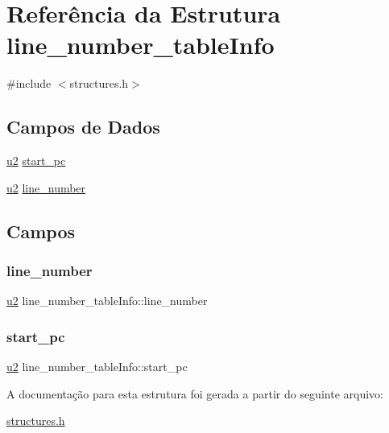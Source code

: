 \hypertarget{structline__number__tableInfo}{}\section{Referência da Estrutura line\+\_\+number\+\_\+table\+Info}
\label{structline__number__tableInfo}


{\ttfamily \#include $<$structures.\+h$>$}

\subsection*{Campos de Dados}
\begin{DoxyCompactItemize}
\item 
\hyperlink{lista__operandos_8h_a732cde1300aafb73b0ea6c2558a7a54f}{u2} \hyperlink{structline__number__tableInfo_a09fe2870e59f80caeeb2b2473e9c07f0}{start\+\_\+pc}
\item 
\hyperlink{lista__operandos_8h_a732cde1300aafb73b0ea6c2558a7a54f}{u2} \hyperlink{structline__number__tableInfo_a3c73371368db11b50865dd474b9e2a7b}{line\+\_\+number}
\end{DoxyCompactItemize}


\subsection{Campos}
\mbox{\label{structline__number__tableInfo_a3c73371368db11b50865dd474b9e2a7b}} 
\subsubsection{\texorpdfstring{line\+\_\+number}{line\_number}}
{\footnotesize\ttfamily \hyperlink{lista__operandos_8h_a732cde1300aafb73b0ea6c2558a7a54f}{u2} line\+\_\+number\+\_\+table\+Info\+::line\+\_\+number}

\mbox{\label{structline__number__tableInfo_a09fe2870e59f80caeeb2b2473e9c07f0}} 
\subsubsection{\texorpdfstring{start\+\_\+pc}{start\_pc}}
{\footnotesize\ttfamily \hyperlink{lista__operandos_8h_a732cde1300aafb73b0ea6c2558a7a54f}{u2} line\+\_\+number\+\_\+table\+Info\+::start\+\_\+pc}



A documentação para esta estrutura foi gerada a partir do seguinte arquivo\+:\begin{DoxyCompactItemize}
\item 
\hyperlink{structures_8h}{structures.\+h}\end{DoxyCompactItemize}
